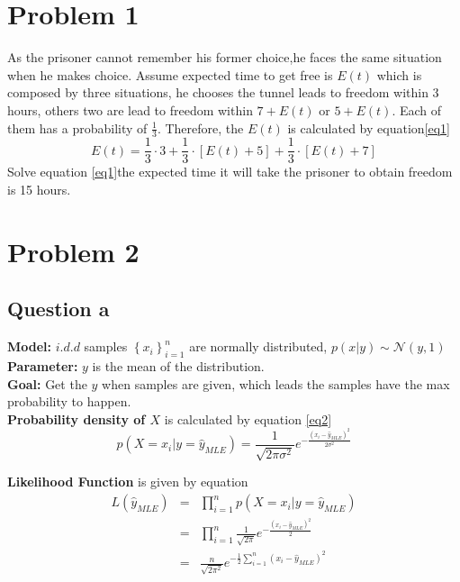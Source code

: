 \documentclass[12pt,letterpaper]{article}
\begin{document}
\section*{Problem 1}
As the prisoner cannot remember his former choice,he faces the same situation when he makes choice. Assume expected time to get free is $E(t)$ which is composed by three situations, he chooses the tunnel leads to freedom within 3 hours, others two are lead to freedom within $7+E(t)$ or $5+E(t)$. Each of them has a probability of $\frac{1}{3}$. Therefore, the $E(t)$ is calculated by equation\ref{eq1}
\begin{equation}\label{eq1}
E\left( t \right) =\frac{1}{3}\cdot 3+\frac{1}{3}\cdot \left[ E\left( t \right) +5 \right] +\frac{1}{3}\cdot \left[ E\left( t \right) +7 \right]
\end{equation}
Solve equation \ref{eq1}the expected time it will take the prisoner to obtain freedom is 15 hours.
\section*{Problem 2}
\subsection*{Question a}
{\bf Model:} $i.d.d$ samples $\left\{ x_i \right\} _{i=1}^{n}$ are normally distributed, $p\left( x|y \right) \sim \mathcal{N}\left( y,1 \right)$\\
{\bf Parameter:} $y$ is the mean of the distribution.\\
{\bf Goal:} Get the $y$ when samples are given, which leads the samples have the max probability to happen.\\
{\bf Probability density of $X$} is calculated by equation \ref{eq2}
\begin{equation}\label{eq2}
  p\left( X=x_i|y=\hat{y}_{MLE} \right) =\frac{1}{\sqrt{2\pi \sigma ^2}}e^{-\frac{\left( x_i-\hat{y}_{MLE} \right) ^2}{2\sigma ^2}}
\end{equation}

{\bf Likelihood Function} is given by equation
\begin{eqnarray}\label{eq3}
  L\left( \hat{y}_{MLE} \right) &=& \prod_{i=1}^n{p\left( X=x_i|y=\hat{y}_{MLE} \right)}\\
  &=& \prod_{i=1}^n{\frac{1}{\sqrt{2\pi}}e^{-\frac{( x_i-\hat{y}_{MLE} ) ^2}{2}}} \nonumber \\
  &=& \frac{n}{\sqrt{2\pi^2}}e^{-\frac{1}{2}\sum_{i=1}^n{\left( x_i-\hat{y}_{MLE} \right) ^2}} \nonumber
\end{eqnarray}
\end{document}
